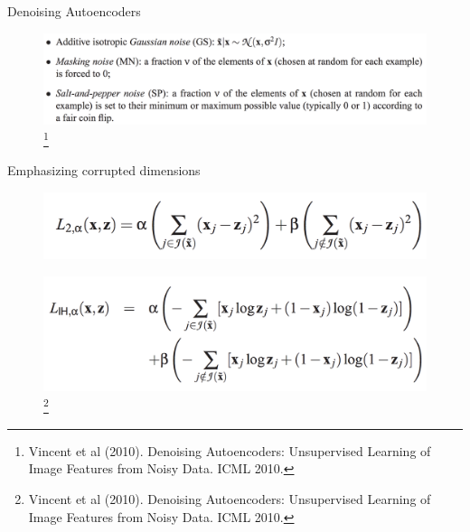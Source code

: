 \begin{frame}[allowframebreaks]{Denoising Autoencoders}
    \framebreak

    \begin{figure}
        \flushleft
        \includegraphics[width=1.08\linewidth,height=\textheight,keepaspectratio]{images/ssl/slide_14_1_img.png}
        \footnote{Vincent et al (2010). Denoising Autoencoders: Unsupervised Learning of Image Features from Noisy Data. ICML 2010.}
    \end{figure}
\end{frame}

\begin{frame}[allowframebreaks]{Emphasizing corrupted dimensions}
    \begin{figure}
        \flushleft
        \includegraphics[width=1.08\linewidth,height=\textheight,keepaspectratio]{images/ssl/slide_15_1_img.png}
    \end{figure}

    \begin{figure}
        \flushleft
        \includegraphics[width=1.08\linewidth,height=\textheight,keepaspectratio]{images/ssl/slide_15_2_img.png}
        \footnote{Vincent et al (2010). Denoising Autoencoders: Unsupervised Learning of Image Features from Noisy Data. ICML 2010.}
    \end{figure}
\end{frame}

